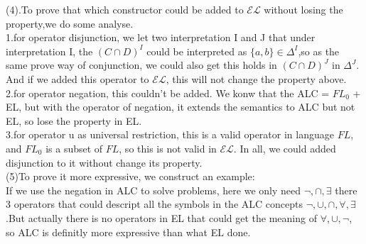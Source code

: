 \documentclass{article}
\begin{document}
    (4).To prove that which constructor could be added to $\mathcal{EL}$ without losing the property,we do some analyse.\\
    1.for operator disjunction, we let two interpretation I and J that under interpretation I, the $(C \cap D)^I$ could be interpreted as $\{a,b\}\in \Delta^I$,so as the same prove way of conjunction, we could also get 
    this holds in $(C\cap D)^J$ in $\Delta^J$. And if we added this operator to $\mathcal{EL}$, this will not change the property above. \\
    2.for operator negation, this couldn't be added. We konw that the ALC = $FL_0$ + EL, but with the operator of negation, it extends the semantics to ALC but not EL, so lose the property in EL.\\
    3.for operator u as universal restriction, this is a valid operator in language $FL$, and $FL_0$ is a subset of $FL$, so this is not valid in $\mathcal{EL}$.
    In all, we could added disjunction to it without change its property.\\
    
    (5)To prove it more expressive, we construct an example:\\
    If we use the negation in ALC to solve problems, here we only need $\neg,\cap,\exists$ there 3 operators that could descript all the symbols
    in the ALC concepts $\neg,\cup,\cap,\forall,\exists$.But actually there is no operators in EL that could get the meaning of $\forall,\cup,\neg$, so ALC
    is definitly more expressive than what EL done.
\end{document}
